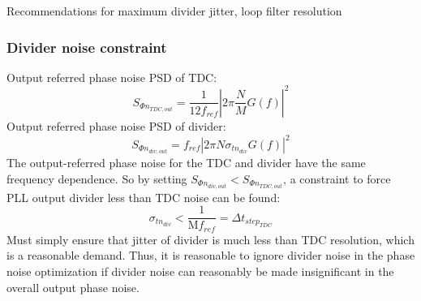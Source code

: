	Recommendations for maximum divider jitter, loop filter resolution
	\subsubsection{Divider noise constraint}
		Output referred phase noise PSD of TDC:
		\begin{equation}
			S_{\Phi n_{TDC,out}} = \frac{1}{12 f_{ref}}\left|2\pi\frac{N}{M} G(f) \right|^2
		\end{equation}
		Output referred phase noise PSD of divider:
		\begin{equation}
			S_{\Phi n_{div, out}} = f_{ref} \left|2\pi N \sigma_{tn_{div}} G(f)\right|^2
		\end{equation}
		The output-referred phase noise for the TDC and divider have the same frequency dependence. So by setting $S_{\Phi n_{div, out}} < S_{\Phi n_{TDC,out}}$, a constraint to force PLL output divider less than TDC noise can be found:
		\begin{equation}
			\sigma_{tn_{div}} < \frac{1}{\mathrm{M}f_{ref}} = \Delta t_{step_{TDC}}
		\end{equation}
		Must simply ensure that jitter of divider is much less than TDC resolution, which is a reasonable demand. Thus, it is reasonable to ignore divider noise in the phase noise optimization if divider noise can reasonably be made insignificant in the overall output phase noise.




\FloatBarrier
